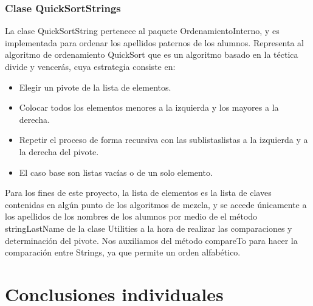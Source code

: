 \documentclass[11pt]{article}
\begin{document}
\subsubsection{Clase QuickSortStrings}
\par
La clase QuickSortString pertenece al paquete OrdenamientoInterno, y es implementada para ordenar los apellidos paternos de los alumnos. Representa al algoritmo de ordenamiento QuickSort que es un algoritmo basado en la téctica divide y vencerás, cuya estrategia consiste en:
\begin{itemize}
\item Elegir un pivote de la lista de elementos.
\item Colocar todos los elementos menores a la izquierda y los mayores a la derecha.
\item Repetir el proceso de forma recursiva con las sublistaslistas a la izquierda y a la derecha del pivote.
\item El caso base son listas vacías o de un solo elemento.
\end{itemize}
Para los fines de este proyecto, la lista de elementos es la lista de claves contenidas en algún punto de los algoritmos de mezcla, y se accede únicamente a los apellidos de los nombres de los alumnos por medio de el método stringLastName de la clase Utilities a la hora de realizar las comparaciones y determinación del pivote. Nos auxiliamos del método compareTo para hacer la comparación entre Strings, ya que permite un orden alfabético.

\section{Conclusiones individuales}
\end{document}
